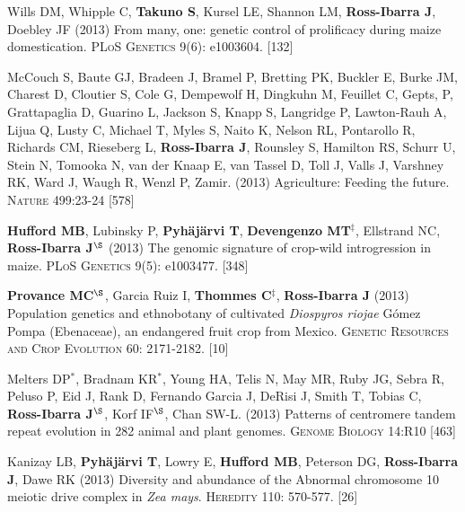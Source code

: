 \documentclass[letterpaper,10pt]{article}
\begin{document}
\begin{etaremune}
\item Wills DM, Whipple C, {\bf Takuno S}, Kursel LE, Shannon LM, {\bf Ross-Ibarra J}, Doebley JF (2013) From many, one: genetic control of prolificacy during maize domestication. \textsc{PLoS Genetics} 9(6): e1003604. %
 [132]\\

\item McCouch S, Baute GJ, Bradeen J, Bramel P, Bretting PK, Buckler E, Burke JM, Charest D, Cloutier S, Cole G, Dempewolf H, Dingkuhn M, Feuillet C, Gepts, P, Grattapaglia D, Guarino L, Jackson S, Knapp S, Langridge P, Lawton-Rauh A, Lijua Q, Lusty C, Michael T, Myles S, Naito K, Nelson RL, Pontarollo R, Richards CM, Rieseberg L, {\bf Ross-Ibarra J}, Rounsley S, Hamilton RS, Schurr U, Stein N, Tomooka N, van der Knaap E, van Tassel D, Toll J, Valls J, Varshney RK, Ward J, Waugh R, Wenzl P, Zamir. (2013) Agriculture: Feeding the future. \textsc{Nature} 499:23-24
 [578]\\

\item {\bf Hufford MB}, Lubinsky P, {\bf Pyh\"aj\"arvi T}, {\bf Devengenzo MT}$^\ddagger$, Ellstrand NC, {\bf Ross-Ibarra J}$^\S$ (2013) The genomic signature of crop-wild introgression in maize. \textsc{PLoS Genetics} 9(5): e1003477. %
 [348]\\


\item {\bf Provance MC}$^\S$, Garcia Ruiz I, {\bf Thommes C}$^\ddagger$, {\bf Ross-Ibarra J} (2013) Population genetics and ethnobotany of cultivated \emph{Diospyros riojae} G\'omez Pompa (Ebenaceae), an endangered fruit crop from Mexico. \textsc{Genetic Resources and Crop Evolution} 60: 2171-2182.
 [10]\\


\item Melters DP$^*$, Bradnam KR$^*$, Young HA, Telis N, May MR, Ruby JG, Sebra R, Peluso P, Eid J, Rank D, Fernando Garcia J, DeRisi J, Smith T, Tobias C, {\bf Ross-Ibarra J}$^\S$, Korf IF$^\S$, Chan SW-L. (2013) Patterns of centromere tandem repeat evolution in 282 animal and plant genomes. \textsc{Genome Biology} 14:R10
 [463]\\


\item Kanizay LB, {\bf Pyh\"aj\"arvi T}, Lowry E, {\bf Hufford MB}, Peterson DG, {\bf Ross-Ibarra J}, Dawe RK (2013) Diversity and abundance of the Abnormal chromosome 10 meiotic drive complex in \emph{Zea mays}. \textsc{Heredity} 110: 570-577.
 [26]\\



\end{etaremune}
\end{document}
